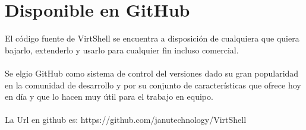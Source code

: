 \appendix
\chapter{Disponible en GitHub}
\label{GitHub}
El código fuente de VirtShell se encuentra a disposición de cualquiera que quiera bajarlo, extenderlo y usarlo para cualquier fin incluso comercial.\\
\\
Se elgio GitHub como sistema de control del versiones dado su gran popularidad en la comunidad de desarrollo y por su conjunto de características que ofrece hoy en día y que lo hacen muy útil para el trabajo en equipo.\\
\\
La Url en github es: https://github.com/janutechnology/VirtShell